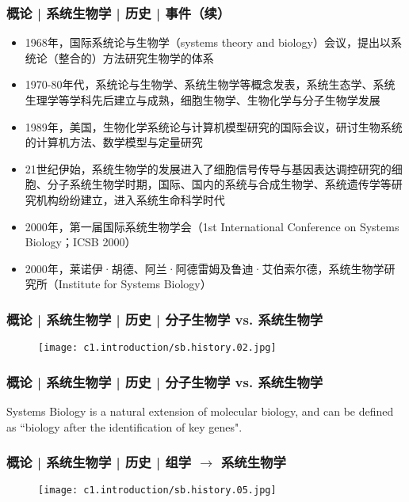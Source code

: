 \begin{frame}
  \frametitle{概论 | 系统生物学 | 历史 | 事件（续）}
  \begin{itemize}
    \item 1968年，国际系统论与生物学（systems theory and biology）会议，提出以系统论（整合的）方法研究生物学的体系
    \item 1970-80年代，系统论与生物学、系统生物学等概念发表，系统生态学、系统生理学等学科先后建立与成熟，细胞生物学、生物化学与分子生物学发展
    \item 1989年，美国，生物化学系统论与计算机模型研究的国际会议，研讨生物系统的计算机方法、数学模型与定量研究
    \item 21世纪伊始，系统生物学的发展进入了细胞信号传导与基因表达调控研究的细胞、分子系统生物学时期，国际、国内的系统与合成生物学、系统遗传学等研究机构纷纷建立，进入系统生命科学时代
    \item 2000年，第一届国际系统生物学会（1st International Conference on Systems Biology；ICSB 2000）
    \item 2000年，莱诺伊·胡德、阿兰·阿德雷姆及鲁迪·艾伯索尔德，系统生物学研究所（Institute for Systems Biology）
  \end{itemize}
\end{frame}

\begin{frame}
  \frametitle{概论 | 系统生物学 | 历史 | 分子生物学 vs. 系统生物学}
  \begin{figure}
    \centering
    \texttt{[image: c1.introduction/sb.history.02.jpg]}
  \end{figure}
\end{frame}

\begin{frame}
  \frametitle{概论 | 系统生物学 | 历史 | 分子生物学 vs. 系统生物学}
  Systems Biology is a natural extension of molecular biology, and can be defined as ``biology after the identification of key genes".
\end{frame}

\begin{frame}
  \frametitle{概论 | 系统生物学 | 历史 | 组学 $\rightarrow$ 系统生物学}
  \begin{figure}
    \centering
    \texttt{[image: c1.introduction/sb.history.05.jpg]}
  \end{figure}
\end{frame}

